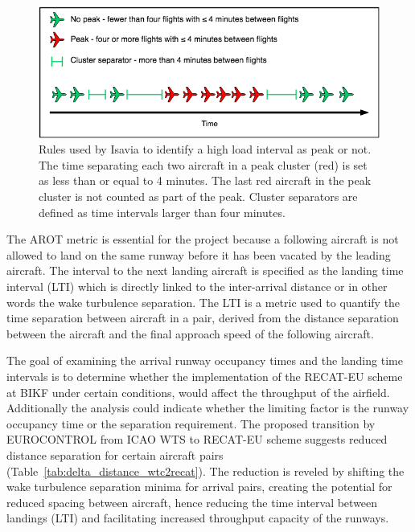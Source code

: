 \begin{figure}[h]
    \centering
    \includegraphics[width=1\textwidth]{graphics/Peak_Diagram.png}
    \caption[Rules defining a peak hour]{Rules used by Isavia to identify a high load interval as peak or not. The time separating each two aircraft in a peak cluster (red) is set as less than or equal to 4 minutes. The last red aircraft in the peak cluster is not counted as part of the peak. Cluster separators are defined as time intervals larger than four minutes.}
    \label{fig:Peak_Diagram}
\end{figure}

The AROT metric is essential for the project because a following aircraft is not allowed to land on the same runway before it has been vacated by the leading aircraft. The interval to the next landing aircraft is specified as the landing time interval (LTI) which is directly linked to the inter-arrival distance or in other words the wake turbulence separation. The LTI is a metric used to quantify the time separation between aircraft in a pair, derived from the distance separation between the aircraft and the final approach speed of the following aircraft.%

The goal of examining the arrival runway occupancy times and the landing time intervals is to determine whether the implementation of the RECAT-EU scheme at BIKF under certain conditions, would affect the throughput of the airfield. Additionally the analysis could indicate whether the limiting factor is the runway occupancy time or the separation requirement. The proposed transition by EUROCONTROL from ICAO WTS to RECAT-EU scheme suggests reduced distance separation for certain aircraft pairs (Table~\ref{tab:delta_distance_wtc2recat}). The reduction is reveled by shifting the wake turbulence separation minima for arrival pairs, creating the potential for reduced spacing between aircraft, hence reducing the time interval between landings (LTI) and facilitating increased throughput capacity of the runways. 

